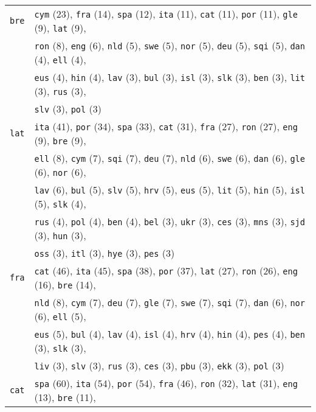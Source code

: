\begin{center}
\begin{longtable}{ll}
\texttt{bre} & \texttt{cym} (23), \texttt{fra} (14), \texttt{spa} (12), \texttt{ita} (11), \texttt{cat} (11), \texttt{por} (11), \texttt{gle} (9), \texttt{lat} (9),\\
 & \texttt{ron} (8), \texttt{eng} (6), \texttt{nld} (5), \texttt{swe} (5), \texttt{nor} (5), \texttt{deu} (5), \texttt{sqi} (5), \texttt{dan} (4), \texttt{ell} (4),\\
 & \texttt{eus} (4), \texttt{hin} (4), \texttt{lav} (3), \texttt{bul} (3), \texttt{isl} (3), \texttt{slk} (3), \texttt{ben} (3), \texttt{lit} (3), \texttt{rus} (3),\\
 & \texttt{slv} (3), \texttt{pol} (3) \\
\texttt{lat} & \texttt{ita} (41), \texttt{por} (34), \texttt{spa} (33), \texttt{cat} (31), \texttt{fra} (27), \texttt{ron} (27), \texttt{eng} (9), \texttt{bre} (9),\\
 & \texttt{ell} (8), \texttt{cym} (7), \texttt{sqi} (7), \texttt{deu} (7), \texttt{nld} (6), \texttt{swe} (6), \texttt{dan} (6), \texttt{gle} (6), \texttt{nor} (6),\\
 & \texttt{lav} (6), \texttt{bul} (5), \texttt{slv} (5), \texttt{hrv} (5), \texttt{eus} (5), \texttt{lit} (5), \texttt{hin} (5), \texttt{isl} (5), \texttt{slk} (4),\\
 & \texttt{rus} (4), \texttt{pol} (4), \texttt{ben} (4), \texttt{bel} (3), \texttt{ukr} (3), \texttt{ces} (3), \texttt{mns} (3), \texttt{sjd} (3), \texttt{hun} (3),\\
 & \texttt{oss} (3), \texttt{itl} (3), \texttt{hye} (3), \texttt{pes} (3) \\
\texttt{fra} & \texttt{cat} (46), \texttt{ita} (45), \texttt{spa} (38), \texttt{por} (37), \texttt{lat} (27), \texttt{ron} (26), \texttt{eng} (16), \texttt{bre} (14),\\
 & \texttt{nld} (8), \texttt{cym} (7), \texttt{deu} (7), \texttt{gle} (7), \texttt{swe} (7), \texttt{sqi} (7), \texttt{dan} (6), \texttt{nor} (6), \texttt{ell} (5),\\
 & \texttt{eus} (5), \texttt{bul} (4), \texttt{lav} (4), \texttt{isl} (4), \texttt{hrv} (4), \texttt{hin} (4), \texttt{pes} (4), \texttt{ben} (3), \texttt{slk} (3),\\
 & \texttt{liv} (3), \texttt{slv} (3), \texttt{rus} (3), \texttt{ces} (3), \texttt{pbu} (3), \texttt{ekk} (3), \texttt{pol} (3) \\
\texttt{cat} & \texttt{spa} (60), \texttt{ita} (54), \texttt{por} (54), \texttt{fra} (46), \texttt{ron} (32), \texttt{lat} (31), \texttt{eng} (13), \texttt{bre} (11),\\

\end{longtable}
\end{center}
